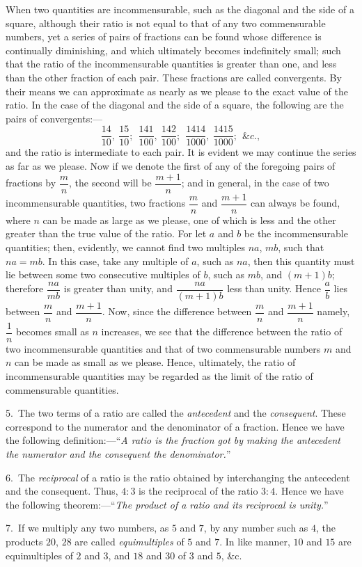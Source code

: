\documentclass[oneside]{book}
\begin{document}
\begin{footnotesize}
When two quantities are incommensurable, such as the diagonal
and the side of a square, although their ratio is not equal to
that of any two commensurable numbers, yet a series of pairs of
fractions can be found whose difference is continually diminishing,
and which ultimately becomes indefinitely small; such that
the ratio of the incommensurable quantities is greater than one,
and less than the other fraction of each pair. These fractions
are called convergents. By their means we can approximate as
nearly as we please to the exact value of the ratio. In the case
of the diagonal and the side of a square, the following are the
pairs of convergents:---
\[
  \frac{14}{10},    \ \frac{15}{10};    \ \
  \frac{141}{100},  \ \frac{142}{100};  \ \
  \frac{1414}{1000},\ \frac{1415}{1000};\ \ \&c.,
\]
and the ratio is intermediate to each pair. It is evident we may
continue the series as far as we please. Now if we denote the
first of any of the foregoing pairs of fractions by $\dfrac{m}{n}$, the second
will be $\dfrac{m+1}{n}$; and in general, in the case of two incommensurable
quantities, two fractions $\dfrac{m}{n}$ and $\dfrac{m+1}{n}$ can always be
found, where $n$ can be made as large as we please, one of which
is less and the other greater than the true value of the ratio.
For let $a$ and $b$ be the incommensurable quantities; then, evidently,
we cannot find two multiples $na$, $mb$, such that $na = mb$.
In this case, take any multiple of $a$, such as $na$, then this quantity
must lie between some two consecutive multiples of $b$, such as $mb$,
and $(m + 1)b$; therefore $\dfrac{na}{mb}$ is greater than unity, and $\dfrac{na}{(m+1)b}$
less than unity. Hence $\dfrac{a}{b}$ lies between $\dfrac{m}{n}$ and $\dfrac{m+1}{n}$. Now,
since the difference between $\dfrac{m}{n}$ and $\dfrac{m+1}{n}$ namely, $\dfrac{1}{n}$ becomes
small as $n$ increases, we see that the difference between the ratio
of two incommensurable quantities and that of two commensurable
numbers $m$ and $n$ can be made as small as we please.
Hence, ultimately, the ratio of incommensurable quantities may
be regarded as the limit of the ratio of commensurable quantities.

5.~The two terms of a ratio are called the \emph{antecedent} and the
\emph{consequent}. These correspond to the numerator and the denominator
of a fraction. Hence we have the following definition:---``\emph{A
ratio is the fraction got by making the antecedent the numerator
and the consequent the denominator.}''

6.~The \emph{reciprocal} of a ratio is the ratio obtained by interchanging
the antecedent and the consequent. Thus, $4 : 3$ is the reciprocal
of the ratio $3 : 4$. Hence we have the following theorem:---``\emph{The
product of a ratio and its reciprocal is unity.}''

7.~If we multiply any two numbers, as $5$ and $7$, by any number
such as $4$, the products $20$, $28$ are called \emph{equimultiples} of $5$ and $7$.
In like manner, $10$ and $15$ are equimultiples of $2$ and $3$, and $18$
and $30$ of $3$ and $5$, \&c.
\par\end{footnotesize}
\end{document}
